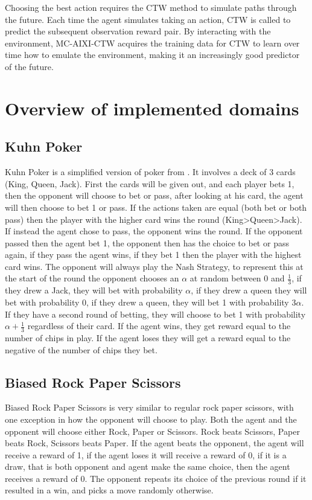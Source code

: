 \documentclass{article}
\theoremstyle{definition}
\newtheorem{primary statistics}[definition]{Primary Statistics}
\newtheorem{auxiliary statistics}[definition]{Auxiliary Statistics}
\begin{document}
Choosing the best action requires the CTW method to simulate paths through the future. Each time the agent simulates taking an action, CTW is called to predict the subsequent observation reward pair. By interacting with the environment, MC-AIXI-CTW acquires the training data for CTW to learn over time how to emulate the environment, making it an increasingly good predictor of the future.

\section{Overview of implemented domains}
\subsection{Kuhn Poker}
Kuhn Poker is a simplified version of poker from \citep{kuhn1950simplified}. It involves a deck of 3 cards (King, Queen, Jack). First the cards will be given out, and each player bets 1, then the opponent will choose to bet or pass, after looking at his card, the agent will then choose to bet 1 or pass. If the actions taken are equal (both bet or both pass) then the player with the higher card wins the round (King>Queen>Jack). If instead the agent chose to pass, the opponent wins the round. If the opponent passed then the agent bet 1, the opponent then has the choice to bet or pass again, if they pass the agent wins, if they bet 1 then the player with the highest card wins. The opponent will always play the Nash Strategy, to represent this at the start of the round the opponent chooses an $\alpha$ at random between 0 and $\frac{1}{3}$, if they drew a Jack, they will bet with probability $\alpha$, if they drew a queen they will bet with probability 0, if they drew a queen, they will bet 1 with probability $3\alpha$. If they have a second round of betting, they will choose to bet 1 with probability $\alpha+\frac{1}{3}$ regardless of their card. If the agent wins, they get reward equal to the number of chips in play. If the agent loses they will get a reward equal to the negative of the number of chips they bet.

\subsection{Biased Rock Paper Scissors}
Biased Rock Paper Scissors is very similar to regular rock paper scissors, with one exception in how the opponent will choose to play. Both the agent and the opponent will choose either Rock, Paper or Scissors. Rock beats Scissors, Paper beats Rock, Scissors beats Paper. If the agent beats the opponent, the agent will receive a reward of 1, if the agent loses it will receive a reward of 0, if it is a draw, that is both opponent and agent make the same choice, then the agent receives a reward of 0. The opponent repeats its choice of the previous round if it resulted in a win, and picks a move randomly otherwise. 
\end{document}
